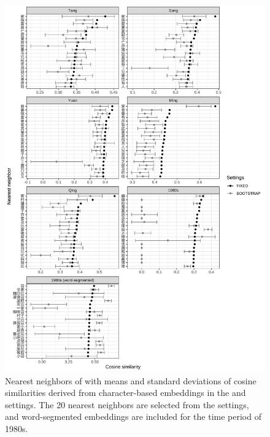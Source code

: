 \newpage
\begin{figure}[H]
  \centering
  \includegraphics[height=0.85\textheight,keepaspectratio]{figures_new/bootstrap_for_stability/neighbor_mean_and_sd_grey.pdf}
  \caption{Nearest neighbors of \jia with means and standard deviations of cosine similarities derived from character-based embeddings in the  and  settings. The 20 nearest neighbors are selected from the  settings, and word-segmented embeddings are included for the time period of 1980s.} \label{fig:bootstrap_mean_sd}
\end{figure}

